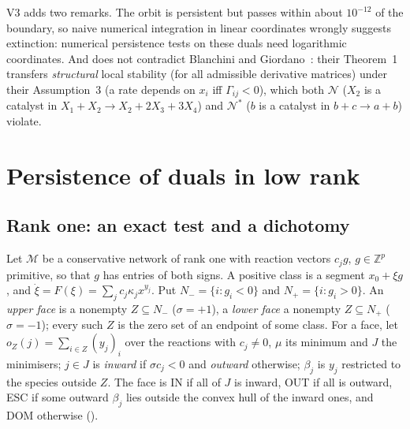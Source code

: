 \documentclass[11pt,a4paper]{report}
\newcommand{\Net}{\mathcal{N}}
\newcommand{\Nd}{\mathcal{N}^{*}}
\begin{document}
V3 adds two remarks. The orbit is persistent but passes within about \(10^{-12}\) of the boundary, so naive numerical
integration in linear coordinates wrongly suggests extinction: numerical persistence tests on these duals need
logarithmic coordinates. And  does not contradict Blanchini and Giordano~\autocite{BlanchiniGiordano2022}:
their Theorem~1 transfers \emph{structural} local stability (for all admissible derivative matrices) under their
Assumption~3 (a rate depends on \(x_i\) iff \(\Gamma_{ij}<0\)), which both \(\Net\) (\(X_2\) is a catalyst in
\(X_1+X_2\to X_2+2X_3+3X_4\)) and \(\Nd\) (\(b\) is a catalyst in \(b+c\to a+b\)) violate.

\section{Persistence of duals in low rank}\label{sec:lowrank}

\subsection{Rank one: an exact test and a dichotomy}

Let \(\mathcal M\) be a conservative network of rank one with reaction vectors \(c_jg\), \(g\in\mathbb{Z}^p\) primitive, so
that \(g\) has entries of both signs. A positive class is a segment \(x_0+\xi g\), and \(\dot\xi=F(\xi)=\sum_jc_j\kappa_jx^{y_j}\).
Put \(N_-=\{i:g_i<0\}\) and \(N_+=\{i:g_i>0\}\). An \emph{upper face} is a nonempty \(Z\subseteq N_-\) (\(\sigma=+1\)), a
\emph{lower face} a nonempty \(Z\subseteq N_+\) (\(\sigma=-1\)); every such \(Z\) is the zero set of an endpoint of some
class. For a face, let \(o_Z(j)=\sum_{i\in Z}(y_j)_i\) over the reactions with \(c_j\ne0\), \(\mu\) its minimum and \(J\) the
minimisers; \(j\in J\) is \emph{inward} if \(\sigma c_j<0\) and \emph{outward} otherwise; \(\beta_j\) is \(y_j\) restricted to
the species outside \(Z\). The face is IN if all of \(J\) is inward, OUT if all is outward, ESC if some outward
\(\beta_j\) lies outside the convex hull of the inward ones, and DOM otherwise ().
\end{document}
